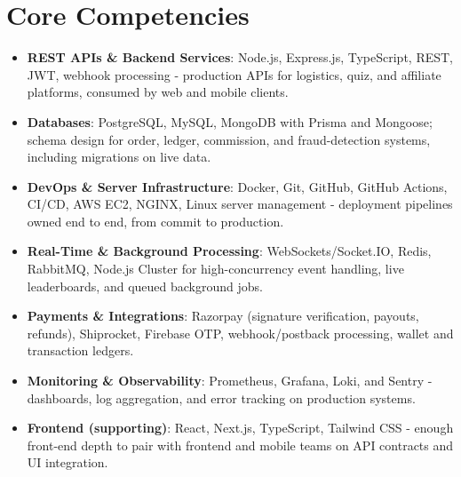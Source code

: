 \documentclass[11pt,a4paper,sans]{moderncv}
\begin{document}
\section{Core Competencies}
\vspace{1pt}
\begin{itemize}

\item \textbf{REST APIs \& Backend Services}: Node.js, Express.js, TypeScript, REST, JWT, webhook processing - production APIs for logistics, quiz, and affiliate platforms, consumed by web and mobile clients.

\item \textbf{Databases}: PostgreSQL, MySQL, MongoDB with Prisma and Mongoose; schema design for order, ledger, commission, and fraud-detection systems, including migrations on live data.

\item \textbf{DevOps \& Server Infrastructure}: Docker, Git, GitHub, GitHub Actions, CI/CD, AWS EC2, NGINX, Linux server management - deployment pipelines owned end to end, from commit to production.

\item \textbf{Real-Time \& Background Processing}: WebSockets/Socket.IO, Redis, RabbitMQ, Node.js Cluster for high-concurrency event handling, live leaderboards, and queued background jobs.

\item \textbf{Payments \& Integrations}: Razorpay (signature verification, payouts, refunds), Shiprocket, Firebase OTP, webhook/postback processing, wallet and transaction ledgers.

\item \textbf{Monitoring \& Observability}: Prometheus, Grafana, Loki, and Sentry - dashboards, log aggregation, and error tracking on production systems.

\item \textbf{Frontend (supporting)}: React, Next.js, TypeScript, Tailwind CSS - enough front-end depth to pair with frontend and mobile teams on API contracts and UI integration.

\end{itemize}

\end{document}
